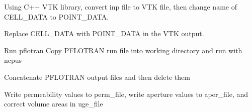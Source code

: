 \documentclass[letterpaper,10pt,english]{sphinxmanual}
\begin{document}

\begin{fulllineitems}
\label{pydfnworks:pydfnworks.flow.parse_pflotran_vtk}
Using C++ VTK library, convert inp file to VTK file, then change name of CELL\_DATA to POINT\_DATA.

\end{fulllineitems}


\begin{fulllineitems}
\label{pydfnworks:pydfnworks.flow.parse_pflotran_vtk_python}
Replace CELL\_DATA with POINT\_DATA in the VTK output.

\end{fulllineitems}


\begin{fulllineitems}
\label{pydfnworks:pydfnworks.flow.pflotran}
Run pflotran
Copy PFLOTRAN run file into working directory and run with ncpus

\end{fulllineitems}


\begin{fulllineitems}
\label{pydfnworks:pydfnworks.flow.pflotran_cleanup}
Concatenate PFLOTRAN output files and then delete them

\end{fulllineitems}


\begin{fulllineitems}
\label{pydfnworks:pydfnworks.flow.write_perms_and_correct_volumes_areas}
Write permeability values to perm\_file, write aperture values to aper\_file, and correct volume areas in uge\_file

\end{fulllineitems}
\end{document}
